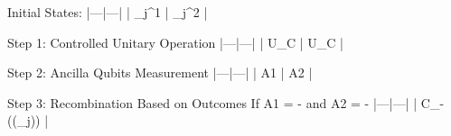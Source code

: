 Initial States: 
    |---|---|
    | \rho_j^1 | \rho_j^2 |

Step 1: Controlled Unitary Operation
    |---|---|
    | U_C | U_C |

Step 2: Ancilla Qubits Measurement
    |---|---|
    | A1 | A2 |

Step 3: Recombination Based on Outcomes
    If A1 = - and A2 = -
        |---|---|
        | C_{-}((\rho_j)) |